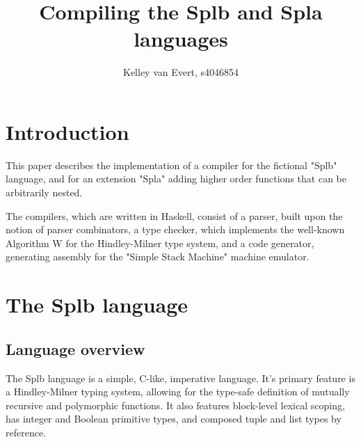 \documentclass[english,10pt]{article} %
\title{Compiling the Splb and Spla languages}
\author{Kelley van Evert, s4046854}
\theoremstyle{definitionstyle}
\theoremstyle{lemmastyle}
\begin{document}
\maketitle


\setcounter{tocdepth}{2} %
\tableofcontents

\section{Introduction}

This paper describes the implementation of a compiler for the fictional "Splb" language, and for an extension "Spla" adding higher order functions that can be arbitrarily nested.

The compilers, which are written in Haskell, consist of a parser, built upon the notion of parser combinators, a type checker, which implements the well-known Algorithm W for the Hindley-Milner type system, and a code generator, generating assembly for the "Simple Stack Machine" machine emulator.


\section{The Splb language}

\subsection{Language overview}

The Splb language is a simple, C-like, imperative language. It's primary feature is a Hindley-Milner typing system, allowing for the type-safe definition of mutually recursive and polymorphic functions. It also features block-level lexical scoping, has integer and Boolean primitive types, and composed tuple and list types by reference.
\end{document}
